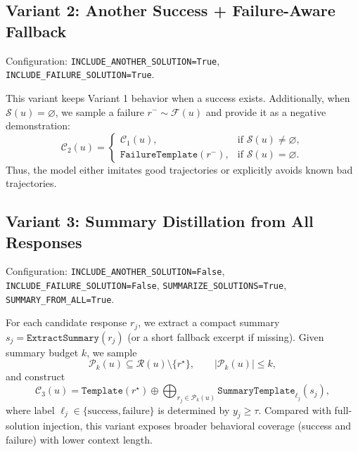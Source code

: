 \subsection{Variant 2: Another Success + Failure-Aware Fallback}
Configuration:
\texttt{INCLUDE\_ANOTHER\_SOLUTION=True},
\texttt{INCLUDE\_FAILURE\_SOLUTION=True}.

This variant keeps Variant 1 behavior when a success exists.
Additionally, when $\mathcal{S}(u)=\varnothing$, we sample a failure
$r^{-}\sim\mathcal{F}(u)$ and provide it as a negative demonstration:
\begin{equation}
\mathcal{C}_2(u)=
\begin{cases}
\mathcal{C}_1(u), & \text{if } \mathcal{S}(u)\neq\varnothing,\\
\texttt{FailureTemplate}(r^{-}), & \text{if } \mathcal{S}(u)=\varnothing.
\end{cases}
\end{equation}
Thus, the model either imitates good trajectories or explicitly avoids known bad trajectories.

\subsection{Variant 3: Summary Distillation from All Responses}
Configuration:
\texttt{INCLUDE\_ANOTHER\_SOLUTION=False},
\texttt{INCLUDE\_FAILURE\_SOLUTION=False},
\texttt{SUMMARIZE\_SOLUTIONS=True},
\texttt{SUMMARY\_FROM\_ALL=True}.

For each candidate response $r_j$, we extract a compact summary
$s_j=\texttt{ExtractSummary}(r_j)$ (or a short fallback excerpt if missing).
Given summary budget $k$, we sample
\begin{equation}
\mathcal{P}_k(u)\subseteq \mathcal{R}(u)\setminus\{r^{\star}\},\qquad |\mathcal{P}_k(u)|\le k,
\end{equation}
and construct
\begin{equation}
\mathcal{C}_3(u)=\texttt{Template}(r^{\star})\oplus
\bigoplus_{r_j\in\mathcal{P}_k(u)}
\texttt{SummaryTemplate}_{\ell_j}(s_j),
\end{equation}
where label $\ell_j\in\{\text{success},\text{failure}\}$ is determined by $y_j\ge\tau$.
Compared with full-solution injection, this variant exposes broader behavioral coverage
(success and failure) with lower context length.

